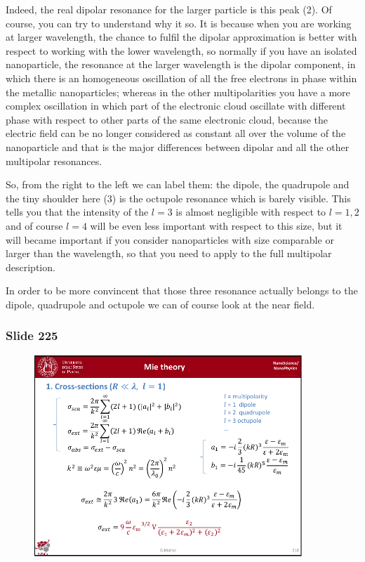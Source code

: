 \documentclass[../main/main.tex]{subfiles}
\begin{document}
Indeed, the real dipolar resonance for the larger particle is this peak (2). Of course, you can try to understand why it so.
It is because when you are working at larger wavelength, the chance to fulfil the dipolar approximation is better with respect to working with the lower wavelength, so normally if you have an isolated nanoparticle, the resonance at the larger wavelength is the dipolar component, in which there is an homogeneous oscillation of all the free electrons in phase within the metallic nanoparticles; whereas in the other multipolarities you have a more complex oscillation in which part of the electronic cloud oscillate with different phase with respect to other parts of the same electronic cloud, because the electric field can be no longer considered as constant all over the volume of the nanoparticle and that is the major differences between dipolar and all the other multipolar resonances.

So, from the right to the left we can label them: the dipole, the quadrupole and the tiny shoulder here (3) is the octupole resonance which is barely visible. This tells you that the intensity of the $l=3$ is almost negligible with respect to $l=1,2$ and of course $l=4$ will be even less important with respect to this size, but it will became important if you consider nanoparticles with size comparable or larger than the wavelength, so that you need to apply to the full multipolar description.

In order to be more convincent that those three resonance actually belongs to the dipole, quadrupole and octupole we can of course look at the near field.

\newpage
\subsubsection{Slide 225}

\begin{figure}[h!]
\centering
\includegraphics[page=8,width=0.9\textwidth]{../lessons/pdf_file/14_lesson.pdf}
\end{figure}
\end{document}

